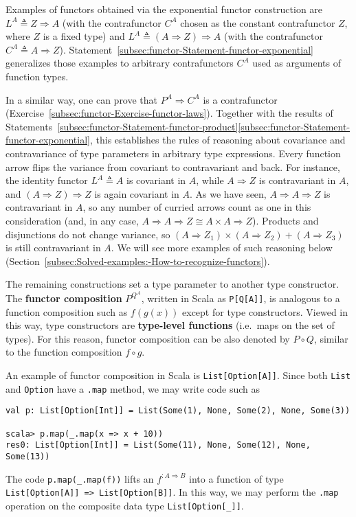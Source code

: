 Examples of functors obtained via the exponential
functor construction are $L^{A}\triangleq Z\Rightarrow A$ (with the
contrafunctor $C^{A}$ chosen as the constant contrafunctor $Z$,
where $Z$ is a fixed type) and $L^{A}\triangleq\left(A\Rightarrow Z\right)\Rightarrow A$
(with the contrafunctor $C^{A}\triangleq A\Rightarrow Z$). Statement~\ref{subsec:functor-Statement-functor-exponential}
generalizes those examples to arbitrary contrafunctors $C^{A}$ used
as arguments of function types.

In a similar way, one can prove that $P^{A}\Rightarrow C^{A}$ is
a contrafunctor (Exercise~\ref{subsec:functor-Exercise-functor-laws}).
Together with the results of Statements~\ref{subsec:functor-Statement-functor-product}\textendash \ref{subsec:functor-Statement-functor-exponential},
this establishes the rules of reasoning about covariance and contravariance
of type parameters in arbitrary type expressions. Every function arrow
flips the variance from covariant to contravariant and back. For instance,
the identity functor $L^{A}\triangleq A$ is covariant in $A$, while
$A\Rightarrow Z$ is contravariant in $A$, and $\left(A\Rightarrow Z\right)\Rightarrow Z$
is again covariant in $A$. As we have seen, $A\Rightarrow A\Rightarrow Z$
is contravariant in $A$, so any number of curried arrows count as
one in this consideration (and, in any case, $A\Rightarrow A\Rightarrow Z\cong A\times A\Rightarrow Z$).
Products and disjunctions do not change variance, so $\left(A\Rightarrow Z_{1}\right)\times\left(A\Rightarrow Z_{2}\right)+\left(A\Rightarrow Z_{3}\right)$
is still contravariant in $A$. We will see more examples of such
reasoning below (Section~\ref{subsec:Solved-examples:-How-to-recognize-functors}).

The remaining constructions set a type parameter to another type constructor.
The \textbf{functor composition} $P^{Q^{A}}$,
written in Scala as \lstinline!P[Q[A]]!, is analogous to a function
composition such as $f(g(x))$ except for type constructors. Viewed
in this way, type constructors are \textbf{type-level functions}
(i.e.~maps on the set of types). For this reason, functor composition
can be also denoted by $P\circ Q$, similar to the function composition
$f\circ g$.

An example of functor composition in Scala is \lstinline!List[Option[A]]!.
Since both \lstinline!List! and \lstinline!Option! have a \lstinline!.map!
method, we may write code such as
\begin{lstlisting}
val p: List[Option[Int]] = List(Some(1), None, Some(2), None, Some(3))

scala> p.map(_.map(x => x + 10))
res0: List[Option[Int]] = List(Some(11), None, Some(12), None, Some(13)) 
\end{lstlisting}
The code \lstinline!p.map(_.map(f))! lifts an $f^{:A\Rightarrow B}$
into a function of type \lstinline!List[Option[A]] => List[Option[B]]!.
In this way, we may perform the \lstinline!.map! operation on the
composite data type \lstinline!List[Option[_]]!. 

